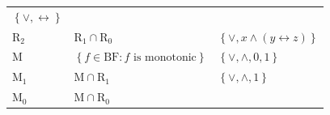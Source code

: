 \documentclass[10pt,a4paper]{article}
\newcommand{\set}[1]{\left\{#1\right\}}
\newcommand{\clonefont}[1]{\mathrm{#1}}
\begin{document}
\begin{figure}[hbtp]
\begin{small}
\begin{longtable}[]{p{}p{}p{}}
\begin{minipage}[t]{0.38\columnwidth}
                \(\set{\lor,\leftrightarrow}\)\strut
            \end{minipage}\tabularnewline
            \begin{minipage}[t]{0.12\columnwidth}\raggedright
                \(\clonefont{R_2}\)\strut
            \end{minipage} & \begin{minipage}[t]{0.41\columnwidth}\raggedright
                \(\clonefont{R_1 \cap R_0}\)\strut
            \end{minipage} & \begin{minipage}[t]{0.38\columnwidth}\raggedright
                \(\set{\lor, x \land (y \leftrightarrow z)}\)\strut
            \end{minipage}\tabularnewline
            \begin{minipage}[t]{0.12\columnwidth}\raggedright
                \(\clonefont{M}\)\strut
            \end{minipage} & \begin{minipage}[t]{0.41\columnwidth}\raggedright
                \(\set{f \in \clonefont{BF} : f \text{ is monotonic}}\)\strut
            \end{minipage} & \begin{minipage}[t]{0.38\columnwidth}\raggedright
                \(\set{\lor,\land,0,1}\)\strut
            \end{minipage}\tabularnewline
            \begin{minipage}[t]{0.12\columnwidth}\raggedright
                \(\clonefont{M_1}\)\strut
            \end{minipage} & \begin{minipage}[t]{0.41\columnwidth}\raggedright
                \(\clonefont{M} \cap \clonefont{R_1}\)\strut
            \end{minipage} & \begin{minipage}[t]{0.38\columnwidth}\raggedright
                \(\set{\lor,\land,1}\)\strut
            \end{minipage}\tabularnewline
            \begin{minipage}[t]{0.12\columnwidth}\raggedright
                \(\clonefont{M_0}\)\strut
            \end{minipage} & \begin{minipage}[t]{0.41\columnwidth}\raggedright
                \(\clonefont{M} \cap \clonefont{R_0}\)\strut
            \end{minipage} & \begin{minipage}[t]{0.38\columnwidth}\raggedright

\end{minipage}
\end{longtable}
\end{small}
\end{figure}
\end{document}
